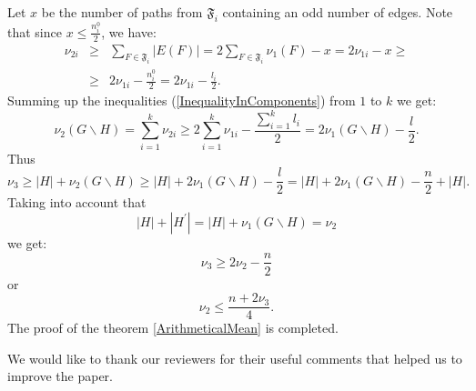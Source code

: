 \documentclass[fleqn,12pt,twoside]{article}
\newenvironment{proof}[1][Proof.]{\begin{trivlist}
\item[\hskip \labelsep {\bfseries #1}]}{\end{trivlist}}
\newenvironment{acknowledgement}[1][Acknowledgement]{\begin{trivlist}
\item[\hskip \labelsep {\bfseries #1}]}{\end{trivlist}}
\begin{document}
\begin{proof}
Let $x$ be the number of paths from $\mathfrak{F}_{i}$ containing an
odd number
of edges. Note that since $x\leq \frac{n_{i}^{0}}{2}$, we have:
\begin{eqnarray*}
\nu _{2i} &\geq &\sum_{F\in \mathfrak{F}_{i}}\left\vert
E(F)\right\vert =2\sum_{F\in \mathfrak{F}_{i}}\nu _{1}(F)-x=2\nu
_{1i}-x\geq \\
&\geq &2\nu _{1i}-\frac{n_{i}^{0}}{2}=2\nu _{1i}-\frac{l_{i}}{2}.
\end{eqnarray*}Summing up the inequalities (\ref{InequalityInComponents}) from $1$
to $k$
we get:\begin{equation*}
\nu _{2}(G\backslash H)=\sum_{i=1}^{k}\nu _{2i}\geq
2\sum_{i=1}^{k}\nu _{1i}-\frac{\sum_{i=1}^{k}l_{i}}{2}=2\nu _{1}(G\backslash H)-\frac{l}{2}\text{.}
\end{equation*}Thus
\begin{equation*}
\nu _{3}\geq \left\vert H\right\vert +\nu _{2}(G\backslash H)\geq
\left\vert H\right\vert +2\nu _{1}(G\backslash
H)-\frac{l}{2}=\left\vert
H\right\vert +2\nu _{1}(G\backslash H)-\frac{n }{2}+\left\vert H\right\vert \text{.}
\end{equation*}Taking into account that
\begin{equation*}
\left\vert H\right\vert +\left\vert H^{\prime }\right\vert
=\left\vert H\right\vert +\nu _{1}(G\backslash H)=\nu _{2}
\end{equation*}we get:
\begin{equation*}
\nu _{3}\geq 2\nu _{2}-\frac{n}{2}
\end{equation*}or
\begin{equation*}
\nu _{2}\leq \frac{n+2\nu _{3}}{4}.
\end{equation*}The proof of the theorem \ref{ArithmeticalMean} is completed.
\end{proof}


\begin{acknowledgement}
We would like to thank our reviewers for their useful comments that helped us to improve the paper.
\end{acknowledgement}
\end{document}
